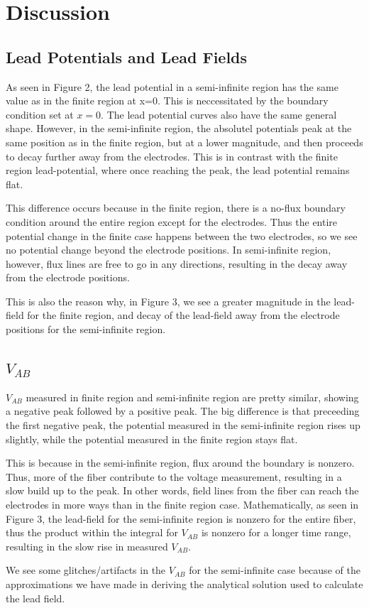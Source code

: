 \documentclass{article}
\begin{document}
\section{Discussion}

\subsection{Lead Potentials and Lead Fields}
As seen in Figure 2, the lead potential in a semi-infinite region has the same value as in the finite region at x=0. This is neccessitated by the boundary condition set at $x=0$. The lead potential curves also have the same general shape. However, in the semi-infinite region, the absolutel potentials peak at the same position as in the finite region, but at a lower magnitude, and then proceeds to decay further away from the electrodes. This is in contrast with the finite region lead-potential, where once reaching the peak, the lead potential remains flat. 

This difference occurs because in the finite region, there is a no-flux boundary condition around the entire region except for the electrodes. Thus the entire potential change in the finite case happens between the two electrodes, so we see no potential change beyond the electrode positions. In semi-infinite region, however, flux lines are free to go in any directions, resulting in the decay away from the electrode positions.

This is also the reason why, in Figure 3,  we see a greater magnitude in the lead-field for the finite region, and decay of the lead-field away from the electrode positions for the semi-infinite region.

\subsection{$V_{AB}$}
$V_{AB}$ measured in finite region and semi-infinite region are pretty similar, showing a negative peak followed by a positive peak. The big difference is that preceeding the first negative peak, the potential measured in the semi-infinite region rises up slightly, while the potential measured in the finite region stays flat.

This is because in the semi-infinite region, flux around the boundary is nonzero. Thus, more of the fiber contribute to the voltage measurement, resulting in a slow build up to the peak. In other words, field lines from the fiber can reach the electrodes in more ways than in the finite region case.  Mathematically, as seen in Figure 3, the lead-field for the semi-infinite region is nonzero for the entire fiber, thus the product within the integral for $V_{AB}$ is nonzero for a longer time range, resulting in the slow rise in measured $V_{AB}$.

We see some glitches/artifacts in the $V_{AB}$ for the semi-infinite case because of the approximations we have made in deriving the analytical solution used to calculate the lead field.
\end{document}
